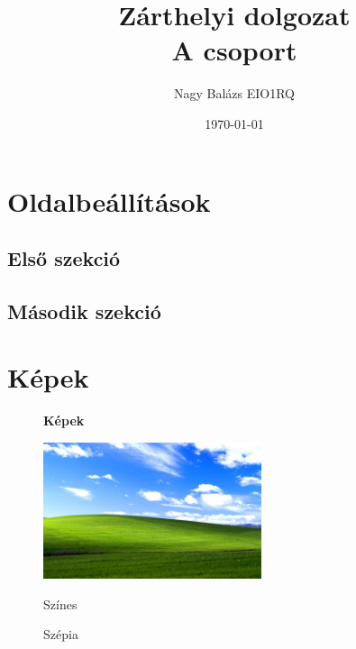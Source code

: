\documentclass[11pt]{book}
\theoremstyle{definition}
\begin{document}
\title{Zárthelyi dolgozat \\A csoport} 
\author{Nagy Balázs EIO1RQ}
\date{\today}
\maketitle



\chapter{Oldalbeállítások}

\section{Első szekció}
\hulipsum[1-10]

\section{Második szekció}
\hulipsum[1-10]

\chapter{Képek}

\hulipsum[1-6]

\begin{figure}
\caption{\textbf{Képek}}
	\begin{flushright}
		\includegraphics[height=4cm, keepaspectratio]{szines}
		\caption{Színes}
	\end{flushright}
	\begin{flushright}
		\caption{Szépia}
	\end{flushright}
\end{figure}
\end{document}

